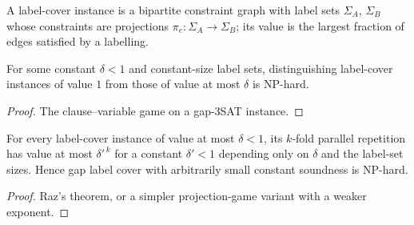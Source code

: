 \begin{definition}
  \label{def:interaction-label-cover}
  A label-cover instance is a bipartite constraint graph with label sets
  $\Sigma_A$, $\Sigma_B$ whose constraints are projections
  $\pi_e : \Sigma_A \to \Sigma_B$; its value is the largest fraction of edges
  satisfied by a labelling.
\end{definition}

\begin{theorem}
  \label{thm:interaction-label-cover-hard}
  \notready
  For some constant $\delta < 1$ and constant-size label sets, distinguishing
  label-cover instances of value $1$ from those of value at most $\delta$ is
  NP-hard.
\end{theorem}
\begin{proof}
  The clause--variable game on a gap-3SAT instance.
\end{proof}

\begin{theorem}
  \label{thm:interaction-parallel-repetition}
  \notready
  For every label-cover instance of value at most $\delta < 1$, its $k$-fold
  parallel repetition has value at most $\delta'^{\,k}$ for a constant
  $\delta' < 1$ depending only on $\delta$ and the label-set sizes. Hence
  gap label cover with arbitrarily small constant soundness is NP-hard.
\end{theorem}
\begin{proof}
  Raz's theorem, or a simpler projection-game variant with a weaker exponent.
\end{proof}
